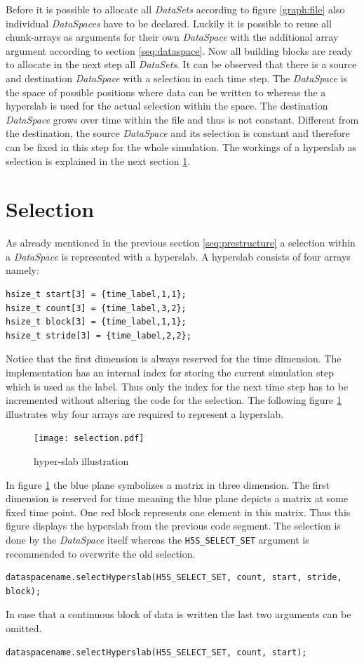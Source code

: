 Before it is possible to allocate all \textit{DataSets} according to figure \ref{graph:file} also individual \textit{DataSpaces} have to be declared. Luckily it is possible to reuse all chunk-arrays as arguments for their own \textit{DataSpace} with the additional array argument according to section \ref{seq:dataspace}. Now all building blocks are ready to allocate in the next step all \textit{DataSets}. It can be observed that there is a source and destination \textit{DataSpace} with a selection in each time step. The \textit{DataSpace} is the space of possible positions where data can be written to whereas the a hyperslab is used for the actual selection within the space. The destination \textit{DataSpace} grows over time within the file and thus is not constant. Different from the destination, the source \textit{DataSpace} and its selection is constant and therefore can be fixed in this step for the whole simulation. The workings of a hyperslab as selection is explained in the next section \ref{seq:selection}.

\section{Selection}
\label{seq:selection}
As already mentioned in the previous section \ref{seq:prestructure} a selection within a \textit{DataSpace} is represented with a hyperslab. A hyperslab consists of four arrays namely:
\begin{lstlisting}
hsize_t start[3] = {time_label,1,1};
hsize_t count[3] = {time_label,3,2};
hsize_t block[3] = {time_label,1,1};
hsize_t stride[3] = {time_label,2,2};
\end{lstlisting}
Notice that the first dimension is always reserved for the time dimension. The implementation has an internal index for storing the current simulation step which is used as the label. Thus only the index for the next time step has to be incremented without altering the code for the selection. The following figure \ref{fig:hyperslab} illustrates why four arrays are required to represent a hyperslab.

\begin{figure}[ht!]
\centering
\texttt{[image: selection.pdf]}
\caption{hyper-slab illustration}
\label{fig:hyperslab}
\end{figure}
In figure \ref{fig:hyperslab} the blue plane symbolizes a matrix in three dimension. The first dimension is reserved for time meaning the blue plane depicts a matrix at some fixed time point. One red block represents one element in this matrix. Thus this figure displays the hyperslab from the previous code segment. The selection is done by the \textit{DataSpace} itself whereas the \texttt{H5S\_SELECT\_SET} argument is recommended to overwrite the old selection.
\begin{lstlisting}
dataspacename.selectHyperslab(H5S_SELECT_SET, count, start, stride, block);
\end{lstlisting}
In case that a continuous block of data is written the last two arguments can be omitted.
\begin{lstlisting}
dataspacename.selectHyperslab(H5S_SELECT_SET, count, start);
\end{lstlisting}


